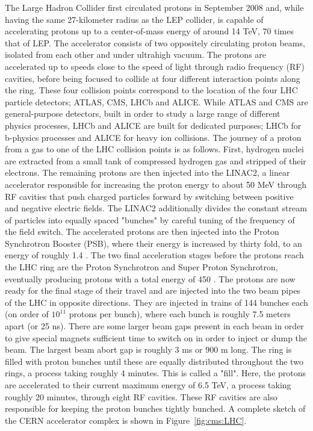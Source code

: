 The Large Hadron Collider first circulated protons in September 2008 and, while having the same 27-kilometer radius as the LEP collider, is capable of accelerating protons up to a center-of-mass energy of around 14 TeV, 70 times that of LEP. The accelerator consists of two oppositely circulating proton beams, isolated from each other and under ultrahigh vacuum. The protons are accelerated up to speeds close to the speed of light through radio frequency (RF) cavities, before being focused to collide at four different interaction points along the ring.
These four collision points correspond to the location of the four LHC particle detectors; ATLAS, CMS, LHCb and ALICE.
While ATLAS and CMS are general-purpose detectors, built in order to study a large range of different physics processes, 
LHCb and ALICE are built for dedicated purposes; LHCb for b-physics processes and ALICE for heavy ion collisions.
The journey of a proton from a gas to one of the LHC collision points is as follows. First, hydrogen nuclei are extracted from a small tank of compressed hydrogen gas and stripped of their electrons. The remaining protons are then
injected into the LINAC2, a linear accelerator responsible for increasing the proton energy to about 50 MeV through RF cavities that push charged particles forward by switching between positive and negative electric fields. The LINAC2 additionally divides the constant stream of particles into equally spaced "bunches" by careful tuning of the frequency of the field switch.
The accelerated protons are then injected into the Proton Synchrotron Booster (PSB), where their energy is increased by thirty fold, to an energy of roughly 1.4 \GeV. The two final acceleration stages before the protons reach the LHC ring are the Proton Synchrotron and Super Proton Synchrotron, eventually producing protons with a total energy of 450 \GeV. The protons are now ready for the final stage of their travel and are injected into the two beam pipes of the LHC in opposite directions. They are injected in trains of 144 bunches each (on order of $10^{11}$ protons per bunch), where each bunch is roughly 7.5 meters apart (or 25 ns). There are some larger beam gaps present in each beam in order to give special magnets sufficient time to switch on in order to inject or dump the beam. The largest beam abort gap is roughly 3 ms or 900 m long. The ring is filled with proton bunches until these are equally distributed throughout the two rings, a process taking roughly 4 minutes. This is called a "fill". Here, the protons are accelerated to their current maximum energy of 6.5 TeV, a process taking roughly 20 minutes, through eight RF cavities. These RF cavities are also responsible for keeping the proton bunches tightly bunched. A complete sketch of the CERN accelerator complex is shown in Figure~\ref{fig:cms:LHC}.
